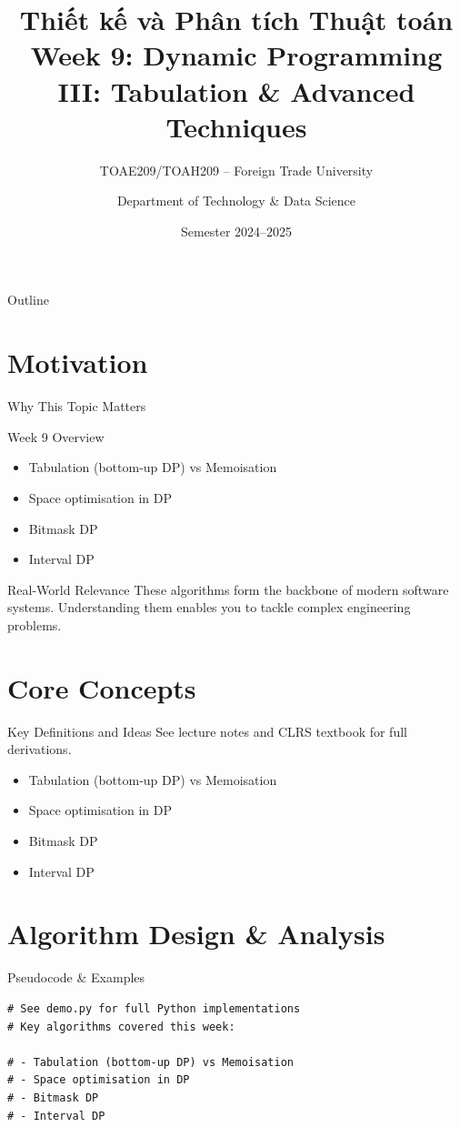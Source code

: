 \documentclass[aspectratio=169,xcolor=dvipsnames]{beamer}
\title[Algorithms -- Week 9]{\textbf{Thiết kế và Phân tích Thuật toán}\\
  \large Week 9: Dynamic Programming III: Tabulation & Advanced Techniques}
\subtitle{TOAE209/TOAH209 -- Foreign Trade University}
\author{Department of Technology \& Data Science}
\date{Semester 2024--2025}
\begin{document}
\begin{frame}\titlepage\end{frame}
\begin{frame}{Outline}\tableofcontents\end{frame}

\section{Motivation}
\begin{frame}{Why This Topic Matters}
  \begin{block}{Week 9 Overview}
    \begin{itemize}
    \item Tabulation (bottom-up DP) vs Memoisation
    \item Space optimisation in DP
    \item Bitmask DP
    \item Interval DP
    \end{itemize}
  \end{block}
  \begin{exampleblock}{Real-World Relevance}
    These algorithms form the backbone of modern software systems.
    Understanding them enables you to tackle complex engineering problems.
  \end{exampleblock}
\end{frame}

\section{Core Concepts}
\begin{frame}{Key Definitions and Ideas}
  See lecture notes and CLRS textbook for full derivations.
  \begin{itemize}
    \item Tabulation (bottom-up DP) vs Memoisation
    \item Space optimisation in DP
    \item Bitmask DP
    \item Interval DP
  \end{itemize}
\end{frame}

\section{Algorithm Design \& Analysis}
\begin{frame}[fragile]{Pseudocode \& Examples}
  \begin{lstlisting}
# See demo.py for full Python implementations
# Key algorithms covered this week:

# - Tabulation (bottom-up DP) vs Memoisation
# - Space optimisation in DP
# - Bitmask DP
# - Interval DP
  \end{lstlisting}
\end{frame}
\end{document}
